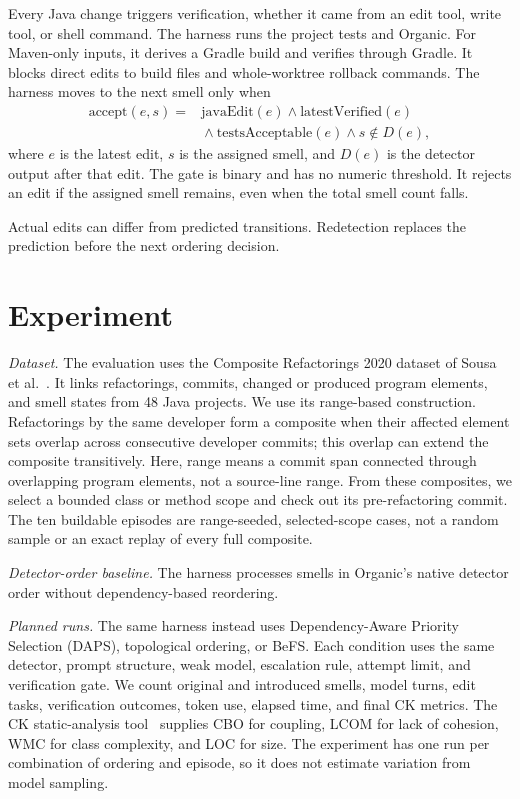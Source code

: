 \documentclass[conference]{IEEEtran}
\begin{document}
Every Java change triggers verification, whether it came from an edit tool,
write tool, or shell command. The harness runs the project tests and Organic.
For Maven-only inputs, it derives a Gradle build and verifies through Gradle.
It blocks direct edits to build files and whole-worktree rollback commands. The
harness moves to the next smell only when
\begin{equation}
\begin{split}
\mathrm{accept}(e,s)={}&\mathrm{javaEdit}(e)\land
\mathrm{latestVerified}(e)\\
&{}\land\mathrm{testsAcceptable}(e)\land s\notin D(e),
\end{split}
\label{eq:accept}
\end{equation}
where $e$ is the latest edit, $s$ is the assigned smell, and $D(e)$ is the
detector output after that edit. The gate is binary and has no numeric
threshold. It rejects an edit if the assigned smell remains, even when the
total smell count falls.

Actual edits can differ from predicted transitions. Redetection replaces the
prediction before the next ordering decision.

\section{Experiment}

\textit{Dataset.} The evaluation uses the Composite Refactorings 2020 dataset
of Sousa et al.~\cite{sousa2020refactoring}. It links refactorings, commits,
changed or produced program elements, and smell states from 48 Java projects.
We use its range-based construction. Refactorings by the same developer form a
composite when their affected element sets overlap across consecutive developer
commits; this overlap can extend the composite transitively. Here, range means
a commit span connected through overlapping program elements, not a source-line
range. From these composites, we select a bounded class or method scope and
check out its pre-refactoring commit. The ten buildable episodes are
range-seeded, selected-scope cases, not a random sample or an exact replay of
every full composite.

\textit{Detector-order baseline.} The harness processes smells in Organic's
native detector order without dependency-based reordering.

\textit{Planned runs.} The same harness instead uses Dependency-Aware Priority
Selection (DAPS), topological ordering, or BeFS.
Each condition uses the same detector, prompt structure, weak model, escalation
rule, attempt limit, and verification gate. We count original and introduced
smells, model turns, edit tasks, verification outcomes, token use, elapsed time,
and final CK metrics. The CK static-analysis tool~\cite{aniche2015ck}
supplies CBO for coupling, LCOM for lack of cohesion, WMC for class complexity,
and LOC for size. The experiment has one run per combination of ordering and
episode, so it does not estimate variation from model sampling.
\end{document}
